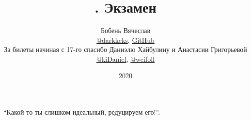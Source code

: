 \documentclass[a4paper]{article}
\title{\HugeАлгебра. Экзамен}
\author{
	Бобень Вячеслав \\
	\href{https://teleg.run/darkkeks}{@darkkeks},
    \href{https://github.com/LoDThe/hse-tex}{GitHub} \\
    За билеты начиная с 17-го спасибо Даниэлю Хайбулину и Анастасии Григорьевой \\
    \href{https://teleg.run/kiDaniel}{@kiDaniel}, \href{https://teleg.run/weifoll}{@weifoll}
}
\date{2020}
\begin{document}
    \maketitle

    \epigraph{
        ``Какой-то ты слишком идеальный, редуцируем его!''.
    }{}

    \tableofcontents

    \newpage

    
    
    
    
    
    
    
    
    
    
    
    
    
    
    
    
    
    
    
    
    
    
    
    
    
    
    
    
    
    
    
    
\end{document}
